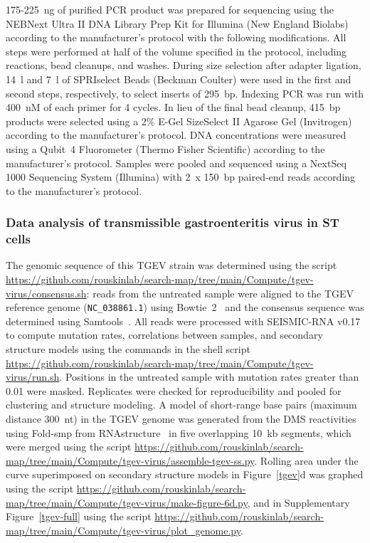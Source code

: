 \documentclass[main.tex]{subfiles}
\begin{document}
175-225~ng of purified PCR product was prepared for sequencing using the NEBNext Ultra II DNA Library Prep Kit for Illumina (New England Biolabs) according to the manufacturer's protocol with the following modifications.
All steps were performed at half of the volume specified in the protocol, including reactions, bead cleanups, and washes.
During size selection after adapter ligation, 14~\textmu l and 7~\textmu l of SPRIselect Beads (Beckman Coulter) were used in the first and second steps, respectively, to select inserts of 295~bp.
Indexing PCR was run with 400~nM of each primer for 4 cycles.
In lieu of the final bead cleanup, 415~bp products were selected using a 2\% E-Gel SizeSelect II Agarose Gel (Invitrogen) according to the manufacturer's protocol.
DNA concentrations were measured using a Qubit~4 Fluorometer (Thermo Fisher Scientific) according to the manufacturer's protocol.
Samples were pooled and sequenced using a NextSeq 1000 Sequencing System (Illumina) with 2~x 150~bp paired-end reads according to the manufacturer's protocol.

\subsubsection{Data analysis of transmissible gastroenteritis virus in ST cells}

The genomic sequence of this TGEV strain was determined using the script \url{https://github.com/rouskinlab/search-map/tree/main/Compute/tgev-virus/consensus.sh}: reads from the untreated sample were aligned to the TGEV reference genome (\verb|NC_038861.1|) using Bowtie~2~\cite{Langmead2012} and the consensus sequence was determined using Samtools~\cite{Li2009}.
All reads were processed with SEISMIC-RNA v0.17 to compute mutation rates, correlations between samples, and secondary structure models using the commands in the shell script \url{https://github.com/rouskinlab/search-map/tree/main/Compute/tgev-virus/run.sh}.
Positions in the untreated sample with mutation rates greater than 0.01 were masked.
Replicates were checked for reproducibility and pooled for clustering and structure modeling.
A model of short-range base pairs (maximum distance 300~nt) in the TGEV genome was generated from the DMS reactivities using Fold-smp from RNAstructure~\cite{Reuter2010} in five overlapping 10~kb segments, which were merged using the script \url{https://github.com/rouskinlab/search-map/tree/main/Compute/tgev-virus/assemble-tgev-ss.py}.
Rolling area under the curve superimposed on secondary structure models in Figure~\ref{tgev}d was graphed using the script \url{https://github.com/rouskinlab/search-map/tree/main/Compute/tgev-virus/make-figure-6d.py}, and in Supplementary Figure~\ref{tgev-full} using the script \url{https://github.com/rouskinlab/search-map/tree/main/Compute/tgev-virus/plot_genome.py}.
\end{document}
